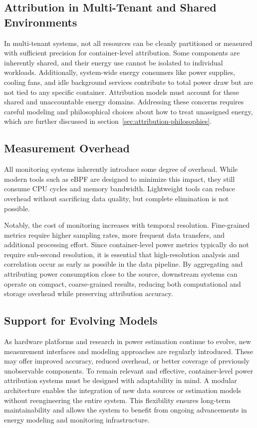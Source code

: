 \subsection*{Attribution in Multi-Tenant and Shared Environments}
\label{sec:shared_envs}

In multi-tenant systems, not all resources can be cleanly partitioned or measured with sufficient precision for container-level attribution. Some components are inherently shared, and their energy use cannot be isolated to individual workloads. Additionally, system-wide energy consumers like power supplies, cooling fans, and idle background services contribute to total power draw but are not tied to any specific container. Attribution models must account for these shared and unaccountable energy domains. Addressing these concerns requires careful modeling and philosophical choices about how to treat unassigned energy, which are further discussed in section~\ref{sec:attribution-philosophies}.

\subsection*{Measurement Overhead}
\label{sec:measurement_overhead}

All monitoring systems inherently introduce some degree of overhead. While modern tools such as eBPF are designed to minimize this impact, they still consume CPU cycles and memory bandwidth. Lightweight tools can reduce overhead without sacrificing data quality, but complete elimination is not possible.

Notably, the cost of monitoring increases with temporal resolution. Fine-grained metrics require higher sampling rates, more frequent data transfers, and additional processing effort. Since container-level power metrics typically do not require sub-second resolution, it is essential that high-resolution analysis and correlation occur as early as possible in the data pipeline. By aggregating and attributing power consumption close to the source, downstream systems can operate on compact, coarse-grained results, reducing both computational and storage overhead while preserving attribution accuracy.

\subsection*{Support for Evolving Models}
\label{sec:evolving_models}

As hardware platforms and research in power estimation continue to evolve, new measurement interfaces and modeling approaches are regularly introduced. These may offer improved accuracy, reduced overhead, or better coverage of previously unobservable components. To remain relevant and effective, container-level power attribution systems must be designed with adaptability in mind. A modular architecture enables the integration of new data sources or estimation models without reengineering the entire system. This flexibility ensures long-term maintainability and allows the system to benefit from ongoing advancements in energy modeling and monitoring infrastructure.

